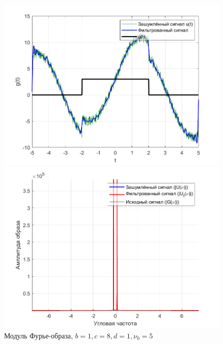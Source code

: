 \documentclass[a4paper]{article}
\begin{document}
\begin{figure}[H]
    \begin{minipage}{0.5\textwidth}
        \centering
        \includegraphics[width=\textwidth]{part2/1_8_1.png}
        \caption{$b = 1, c = 8, d = 1, \nu_0 = 5$}
    \end{minipage}    
    \begin{minipage}{0.5\textwidth}
        \centering
        \includegraphics[width=\textwidth]{part2/1_8_1_Fourier.png}
        \caption{Модуль Фурье-образа, $b = 1, c = 8, d = 1, \nu_0 = 5$}
    \end{minipage}
\end{figure}\
\end{document}
